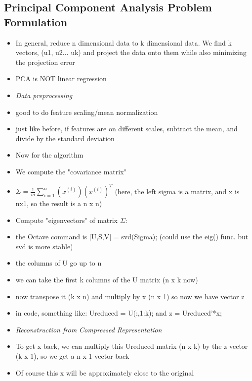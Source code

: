\documentclass[]{article}
\begin{document}
	\subsection{Principal Component Analysis Problem Formulation}
		\begin{itemize}
			\item In general, reduce n dimensional data to k dimensional data. We find k vectors, (u1, u2... uk) and project the data onto them while also minimizing the projection error
			\item PCA is NOT linear regression
			\item \emph{Data preprocessing}
			\item good to do feature scaling/mean normalization
			\item just like before, if features are on different scales, subtract the mean, and divide by the standard deviation
			\item Now for the algorithm
			\item We compute the "covariance matrix"
			\item $\Sigma = \frac{1}{m}\sum\limits_{i=1}^{n}(x^{(i)})(x^{(i)})^T$ (here, the left sigma is a matrix, and x is nx1, so the result is a n x n)
			\item Compute "eigenvectors" of matrix $\Sigma$:
			\item the Octave command is [U,S,V] = svd(Sigma); (could use the eig() func. but svd is more stable)
			\item the columns of U go up to n
			\item we can take the first k columns of the U matrix (n x k now)
			\item now transpose it (k x n) and multiply by x (n x 1) so now we have vector z
			\item in code, something like: Ureduced = U(:,1:k); and z = Ureduced'*x;
			\\
			\item \emph{Reconstruction from Compressed Representation}
			\item To get x back, we can multiply this Ureduced matrix (n x k) by the z vector (k x 1), so we get a n x 1 vector back
			\item Of course this x will be approximately close to the original
		\end{itemize}
		
\end{document}
